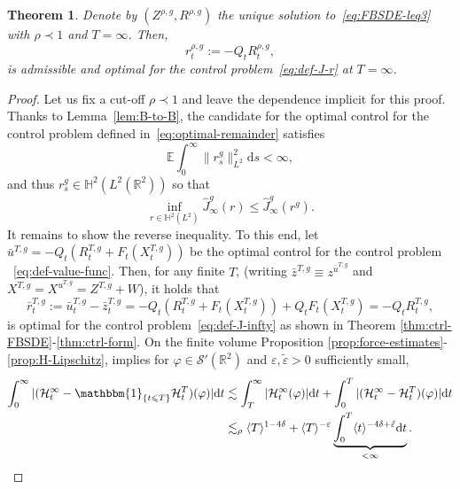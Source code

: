 \documentclass[11pt, a4paper]{scrartcl}
\numberwithin{equation}{section}
\theoremstyle{plain}
\newtheorem{theorem}[foo]{Theorem}
\theoremstyle{remark}
\newcommand{\assign}{:=}
\newcommand{\mathd}{\mathrm{d}}
\begin{document}
\begin{theorem}
  \label{thm:finite-vol-var}Denote by $(Z^{\rho, g}, R^{\rho, g})$ the unique
  solution to~\eqref{eq:FBSDE-leq3} with $\rho \prec 1$ and $T = \infty$. Then,
  \begin{equation}
    r^{\rho, g}_t \assign - Q_t R^{\rho, g}_t \label{eq:optimal-remainder},
  \end{equation}
  is admissible and optimal for the control problem~\eqref{eq:def-J-r} at $T
  = \infty$.
\end{theorem}

\begin{proof}
  Let us fix a cut-off $\rho \prec 1$ and leave the dependence implicit for this
  proof. Thanks to Lemma~\ref{lem:B-to-B}, the candidate for the optimal
  control for the control problem defined in~\eqref{eq:optimal-remainder}
  satisfies
  \[ \mathbb{E} \int_0^{\infty} \| r^g_s \|^2_{L^2} \mathd s < \infty, \]
  and thus $r^g_s \in \mathbb{H}^2 (L^2 (\mathbb{R}^2))$ so that
  \[ \inf_{r \in \mathbb{H}^2 (L^2)}  \hat{J}_{\infty}^g (r) \leqslant
     \hat{J}_{\infty}^g (r^g) . \]
  It remains to show the reverse inequality. To this end, let $\bar{u}^{T, g}
  = - Q_t (R^{T, g}_t + F_t (X^{T, g}_t))$ be the optimal control for the
  control problem ~\eqref{eq:def-value-func}. Then, for any finite $T$, 
  (writing $\bar{z}^{T, g} \equiv z^{\bar{u}^{T, g}}$ and $X^{T, g} = X^{u^{T,
  g}} = Z^{T, g} + W$), it holds that
  \[ \bar{r}_t^{T, g} \assign \bar{u}^{T, g}_t - \bar{z}_t^{T, g} = - Q_t (R^{T, g}_t + F_t
     (X^{T, g}_t)) + Q_t F_t (X_t^{T, g}) = - Q_t R_t^{T, g}, \]
  is optimal for the control problem~\eqref{eq:def-J-infty} as shown in
  Theorem \ref{thm:ctrl-FBSDE}-\ref{thm:ctrl-form}. On the finite volume
  Proposition \ref{prop:force-estimates}-\ref{prop:H-Lipschitz}, implies for
  $\varphi \in \mathcal{S}' (\mathbb{R}^2)$ and $\varepsilon,
  \tilde{\varepsilon} > 0$ sufficiently small,
  \[ \begin{aligned}
       \int_0^{\infty} | (\mathcal{H}^{\infty}_t -\mathbbm{1}_{\{ t \leqslant
       T \}} \mathcal{H}^T_t) (\varphi) | \mathd t & \lesssim 
       \int_T^{\infty} | \mathcal{H}^{\infty}_t (\varphi) | \mathd t +
       \int_0^T | (\mathcal{H}^{\infty}_t -\mathcal{H}^T_t) (\varphi) | \mathd
       t\\
       &\lesssim_{\rho}  \langle T \rangle^{1 - 4 \delta} + \langle T
       \rangle^{- \varepsilon} \underbrace{\int_0^T \langle t \rangle^{- 4
       \delta + \tilde{\varepsilon}} \mathd t}_{< \infty} .
     \end{aligned} \]

\end{proof}
\end{document}
